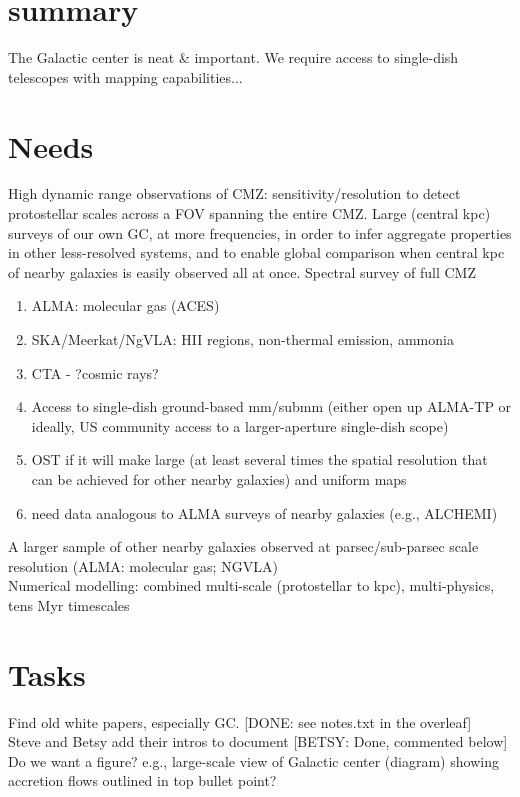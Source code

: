 \documentclass[modern]{aastex62}
\begin{document}
\section{summary}
The Galactic center is neat \& important.
We require access to single-dish telescopes with mapping capabilities...




\section{Needs}
High dynamic range observations of CMZ: sensitivity/resolution to detect
protostellar scales across a FOV spanning the entire CMZ. Large (central kpc)
surveys of our own GC, at more frequencies, in order to infer aggregate
properties in other less-resolved systems, and to enable global comparison when
central kpc of nearby galaxies is easily observed all at once. Spectral survey
of full CMZ
\begin{enumerate}
    \item ALMA: molecular gas (ACES)
    \item SKA/Meerkat/NgVLA: HII regions, non-thermal emission, ammonia
    \item CTA - ?cosmic rays?
    \item Access to single-dish ground-based mm/submm  (either open up ALMA-TP or ideally, US community access to a larger-aperture single-dish scope)
    \item OST if it will make large (at least several times the spatial resolution that can be achieved for other nearby galaxies)  and uniform maps
    \item need data analogous to ALMA surveys of nearby galaxies (e.g., ALCHEMI)
\end{enumerate}
A larger sample of other nearby galaxies observed at parsec/sub-parsec scale resolution (ALMA: molecular gas; NGVLA)\\
Numerical modelling: combined multi-scale (protostellar to kpc), multi-physics, tens Myr timescales

\section{Tasks}
Find old white papers, especially GC.  [DONE: see notes.txt in the overleaf]\\
Steve and Betsy add their intros to document [BETSY: Done, commented below]\\


Do we want a figure?  e.g., large-scale view of Galactic center (diagram) showing accretion flows outlined in top bullet point? \\
\end{document}
